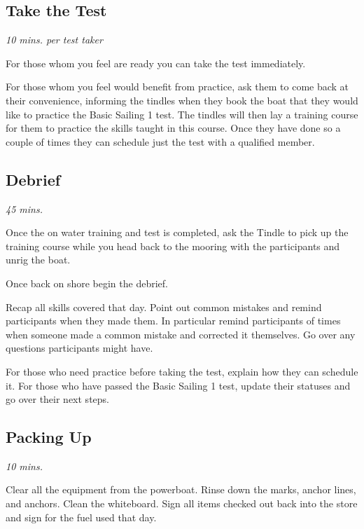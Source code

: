 \documentclass[12pt]{scrartcl}
\begin{document}
\subsection{Take the Test} \label{subsec:take the test}

{\small \textit{10 mins. per test taker}}

For those whom you feel are ready you can take the test immediately.

For those whom you feel would benefit from practice, ask them to come back at their convenience, informing the tindles when they book the boat that they would like to practice the Basic Sailing 1 test. The tindles will then lay a training course for them to practice the skills taught in this course. Once they have done so a couple of times they can schedule just the test with a qualified member.

\subsection{Debrief} \label{subsec: Debrief}

{\small \textit{45 mins.}}

Once the on water training and test is completed, ask the Tindle to pick up the training course while you head back to the mooring with the participants and unrig the boat.

Once back on shore begin the debrief.

Recap all skills covered that day. Point out common mistakes and remind participants when they made them. In particular remind participants of times when someone made a common mistake and corrected it themselves. Go over any questions participants might have.

For those who need practice before taking the test, explain how they can schedule it. For those who have passed the Basic Sailing 1 test, update their statuses and go over their next steps.

\subsection{Packing Up} \label{subsec:packing up}

{\small \textit{10 mins.}}

Clear all the equipment from the powerboat. Rinse down the marks, anchor lines, and anchors. Clean the whiteboard. Sign all items checked out back into the store and sign for the fuel used that day.
\end{document}
